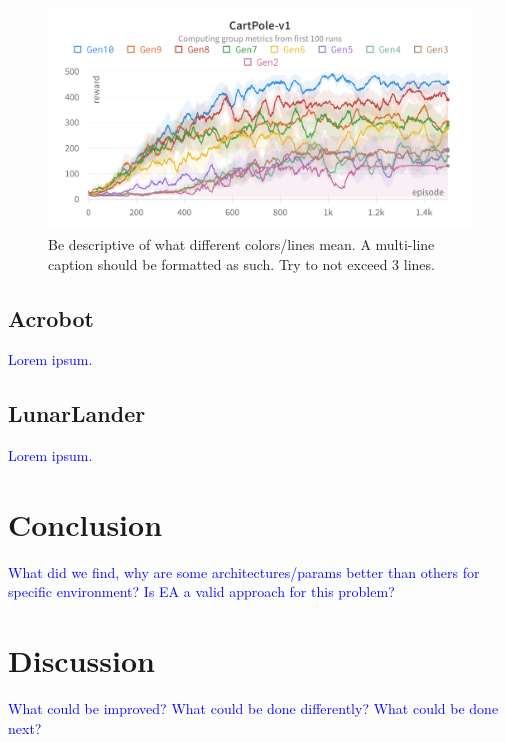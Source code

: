 \documentclass{article}
\newcommand{\TODO}[1]{\textcolor{blue}{#1}}
\begin{document}
\begin{figure}[htbp]
    \centering
    \includegraphics[width=0.9\linewidth]{figs/lc-cp.png}
    \caption{
        Be descriptive of what different colors/lines mean.
        A multi-line caption should be formatted as such.
        Try to not exceed 3 lines.
    }
    \label{fig:lc-cp}
\end{figure}

\subsection{Acrobot}
\label{ssec:ab}

\TODO{Lorem ipsum.}

\subsection{LunarLander}
\label{ssec:ll}

\TODO{Lorem ipsum.}

\section{Conclusion}
\label{sec:conc}

\TODO{
    What did we find, why are some architectures/params better than others for specific environment?
    Is EA a valid approach for this problem?
}

\section{Discussion}
\label{sec:disc}

\TODO{
    What could be improved?
    What could be done differently?
    What could be done next?
}


\end{document}
